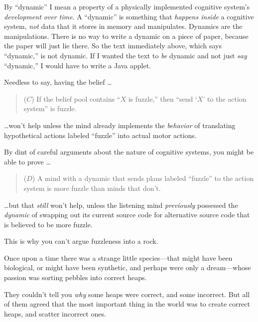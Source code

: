 {
 By ``dynamic'' I mean a
property of a physically implemented cognitive system's
\textit{development over time}. A
``dynamic'' is something that
\textit{happens inside} a cognitive system, \textit{not} data that it
stores in memory and manipulates. Dynamics are the manipulations. There
is no way to write a dynamic on a piece of paper, because the paper
will just lie there. So the text immediately above, which says
``dynamic,'' is not dynamic. If I
wanted the text to \textit{be} dynamic and not just \textit{say}
``dynamic,'' I would have to write a
Java applet.}

{
 Needless to say, having the belief \ldots}

\begin{quotation}
{
 ($C$) If the belief pool contains ``$X$ is
fuzzle,'' then ``send
`$X$' to the action
system'' is fuzzle.}
\end{quotation}

{
 \ldots won't help unless the mind already
implements the \textit{behavior} of translating hypothetical actions
labeled ``fuzzle'' into actual motor
actions.}

{
 By dint of careful arguments about the nature of cognitive
systems, you might be able to prove \ldots}

\begin{quotation}
{
 ($D$) A mind with a dynamic that sends plans labeled
``fuzzle'' to the action system is
  more fuzzle than minds that don't.}
\end{quotation}

{
 \ldots but that \textit{still} won't help, unless
the listening mind \textit{previously} possessed the \textit{dynamic}
of swapping out its current source code for alternative source code
that is believed to be more fuzzle.}

{
 This is why you can't argue fuzzleness into a
rock.}

\myendsectiontext


{
 Once upon a time there was a strange little species---that might
have been biological, or might have been synthetic, and perhaps were
only a dream---whose passion was sorting pebbles into correct heaps. }

{
 They couldn't tell you \textit{why} some heaps
were correct, and some incorrect. But all of them agreed that the most
important thing in the world was to create correct heaps, and scatter
incorrect ones.}

